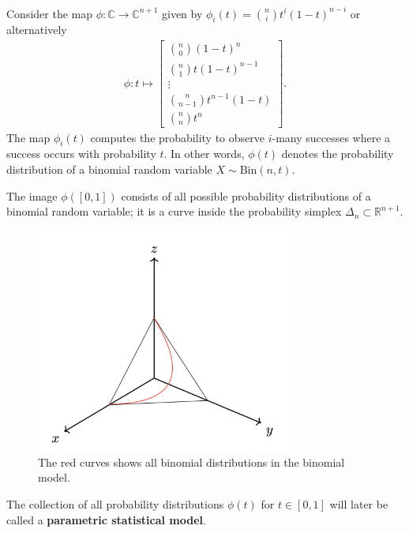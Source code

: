 \begin{eg}
  Consider the map \( \phi: \mathbb{C} \to \mathbb{C}^{n+1} \) given by \( \phi_i(t) = {n \choose i} t^{i}(1 - t)^{n- i} \) or alternatively
  \begin{align*}
    \phi: t \mapsto \begin{bmatrix}
      {n \choose 0} (1-t)^n \\ {n \choose 1} t (1-t)^{n-1} \\ \vdots \\ {n \choose n-1} t^{n - 1} (1 - t) \\ {n \choose n} t^n
    \end{bmatrix}.
  \end{align*}
  The map \( \phi_i(t) \) computes the probability to observe \( i \)-many successes where a success occurs with probability \( t \). In other words, \( \phi(t) \) denotes the probability distribution of a binomial random variable \( X \sim \mathrm{Bin}(n,t) \).

  The image \( \phi([0,1]) \) consists of all possible probability distributions of a binomial random variable; it is a curve inside the probability simplex \( \Delta_{n} \subset \mathbb R^{n + 1} \).

  \begin{figure}[H]
    \centering
    \includegraphics*[width=0.75\textwidth]{assets/binomial_curve_on_simplex.png}
    \caption{The red curves shows all binomial distributions in the binomial model.}
  \end{figure}
  The collection of all probability distributions \( \phi(t) \) for \( t \in [0,1] \) will later be called a \textbf{parametric statistical model}.
\end{eg}

